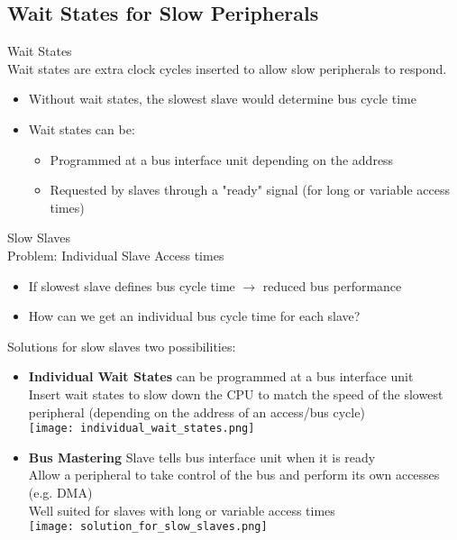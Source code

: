 \subsection{Wait States for Slow Peripherals}

\begin{definition}{Wait States}\\
Wait states are extra clock cycles inserted to allow slow peripherals to respond.
\begin{itemize}
    \item Without wait states, the slowest slave would determine bus cycle time
    \item Wait states can be:
    \begin{itemize}
        \item Programmed at a bus interface unit depending on the address
        \item Requested by slaves through a "ready" signal (for long or variable access times)
    \end{itemize}
\end{itemize}
\end{definition}

\begin{definition}{Slow Slaves}\\
    Problem: Individual Slave Access times
    \begin{itemize}
        \item If slowest slave defines bus cycle time $\rightarrow$ reduced bus performance
        \item How can we get an individual bus cycle time for each slave?
    \end{itemize}   
\end{definition}

\begin{concept}{Solutions for slow slaves} two possibilities:
    \begin{itemize}
        \item \textbf{Individual Wait States} can be programmed at a bus interface unit \\
        Insert wait states to slow down the CPU to match the speed of the slowest peripheral (depending on the address of an access/bus cycle)\\
        \texttt{[image: individual\_wait\_states.png]}
        \item \textbf{Bus Mastering} Slave tells bus interface unit when it is ready \\
        Allow a peripheral to take control of the bus and perform its own accesses (e.g. DMA)\\
        Well suited for slaves with long or variable access times\\
        \texttt{[image: solution\_for\_slow\_slaves.png]}
    \end{itemize}
\end{concept}

